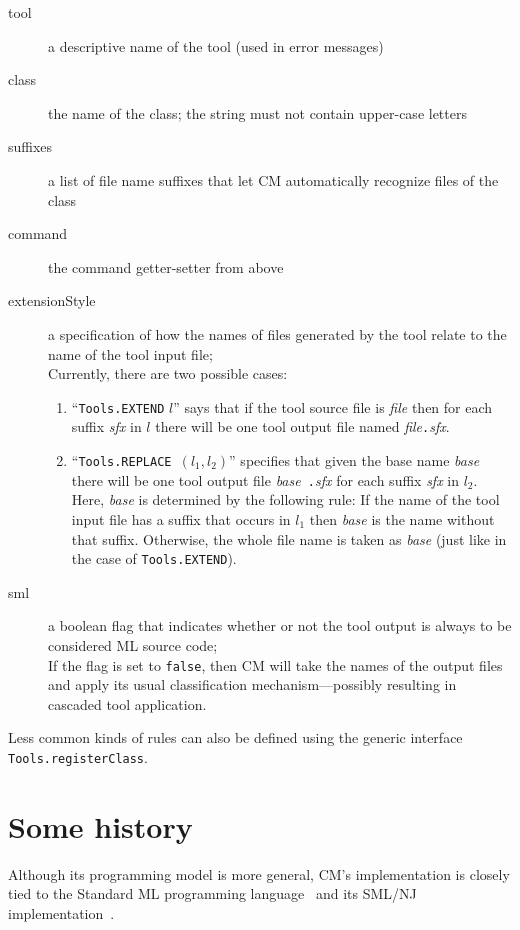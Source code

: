 \documentclass{article}
\begin{document}
\begin{description}
\item[tool] a descriptive name of the tool (used in error messages)
\item[class] the name of the class; the string must not contain
upper-case letters
\item[suffixes] a list of file name suffixes that let CM automatically
recognize files of the class
\item[command] the command getter-setter from above
\item[extensionStyle] a specification of how the names of files
generated by the tool relate to the name of the tool input file; \\
Currently, there are two possible cases:
\begin{enumerate}
\item ``{\tt Tools.EXTEND} $l$'' says that if the tool source file is
{\it file} then for each suffix {\it sfx} in $l$ there will be one tool
output file named {\it file}{\tt .}{\it sfx}.
\item ``{\tt Tools.REPLACE }$(l_1, l_2)$'' specifies that given the
base name {\it base} there will be one tool output file {\it base}{\tt
.}{\it sfx} for each suffix {\it sfx} in $l_2$.  Here, {\it base} is
determined by the following rule:  If the name of the tool input file
has a suffix that occurs in $l_1$ then {\it base} is the name without
that suffix.  Otherwise, the whole file name is taken as {\it base}
(just like in the case of {\tt Tools.EXTEND}).
\end{enumerate}
\item[sml] a boolean flag that indicates whether or not the tool
output is always to be considered ML source code; \\
If the flag is set to {\tt false}, then CM will take the names of the
output files and apply its usual classification mechanism---possibly
resulting in cascaded tool application.
\end{description}

Less common kinds of rules can also be defined using the generic
interface {\tt Tools.registerClass}.

\section{Some history}

Although its programming model is more general, CM's implementation is
closely tied to the Standard ML programming language~\cite{milner97}
and its SML/NJ implementation~\cite{appel91:sml}.
\end{document}

